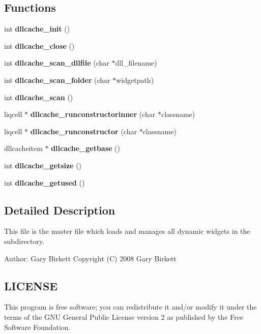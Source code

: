 \subsection*{Functions}
\begin{CompactItemize}
\item 
int {\bf dllcache\_\-init} ()
\item 
int {\bf dllcache\_\-close} ()
\item 
int \textbf{dllcache\_\-scan\_\-dllfile} (char $\ast$dll\_\-filename)\label{d4/d58/liqcell__dllcache_8c_f4e056c0c2b19bda38b3d5157bd7ee0d}

\item 
int \textbf{dllcache\_\-scan\_\-folder} (char $\ast$widgetpath)\label{d4/d58/liqcell__dllcache_8c_7a0c58383c34247f8e4279a62fd78e14}

\item 
int {\bf dllcache\_\-scan} ()
\item 
liqcell $\ast$ \textbf{dllcache\_\-runconstructorinner} (char $\ast$classname)\label{d4/d58/liqcell__dllcache_8c_38bc91eaf35e744083278b67d6397cb2}

\item 
liqcell $\ast$ {\bf dllcache\_\-runconstructor} (char $\ast$classname)
\item 
dllcacheitem $\ast$ \textbf{dllcache\_\-getbase} ()\label{d4/d58/liqcell__dllcache_8c_8050fd87805acbcf6f7fc4caad423f28}

\item 
int \textbf{dllcache\_\-getsize} ()\label{d4/d58/liqcell__dllcache_8c_e364073ee08c733f9be5acb008bb17c2}

\item 
int \textbf{dllcache\_\-getused} ()\label{d4/d58/liqcell__dllcache_8c_b4ae9856d634388cb1c465b69716e9ec}

\end{CompactItemize}


\label{_details}
\subsection{Detailed Description}
This file is the master file which loads and manages all dynamic widgets in the subdirectory. 

\begin{Desc}
\item[Author:]Gary Birkett Copyright (C) 2008 Gary Birkett\end{Desc}
\subsection{LICENSE}\label{de/d77/liqui_8c_LICENSE}
This program is free software; you can redistribute it and/or modify it under the terms of the GNU General Public License version 2 as published by the Free Software Foundation.

